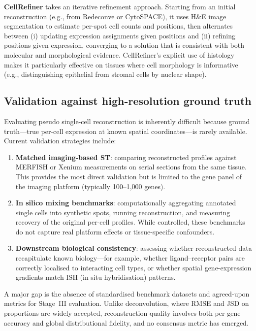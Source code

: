 \textbf{CellRefiner} \citep{cellrefiner2026} takes an iterative refinement approach. Starting from an initial reconstruction (e.g., from Redeconve or CytoSPACE), it uses H\&E image segmentation to estimate per-spot cell counts and positions, then alternates between (i) updating expression assignments given positions and (ii) refining positions given expression, converging to a solution that is consistent with both molecular and morphological evidence. CellRefiner's explicit use of histology makes it particularly effective on tissues where cell morphology is informative (e.g., distinguishing epithelial from stromal cells by nuclear shape).



\subsection{Validation against high-resolution ground truth}

Evaluating pseudo single-cell reconstruction is inherently difficult because ground truth---true per-cell expression at known spatial coordinates---is rarely available. Current validation strategies include:

\begin{enumerate}
  \item \textbf{Matched imaging-based ST}: comparing reconstructed profiles against MERFISH or Xenium measurements on serial sections from the same tissue. This provides the most direct validation but is limited to the gene panel of the imaging platform (typically 100--1{,}000 genes).
  \item \textbf{In silico mixing benchmarks}: computationally aggregating annotated single cells into synthetic spots, running reconstruction, and measuring recovery of the original per-cell profiles. While controlled, these benchmarks do not capture real platform effects or tissue-specific confounders.
  \item \textbf{Downstream biological consistency}: assessing whether reconstructed data recapitulate known biology---for example, whether ligand--receptor pairs are correctly localised to interacting cell types, or whether spatial gene-expression gradients match ISH (in situ hybridisation) patterns.
\end{enumerate}

A major gap is the absence of standardised benchmark datasets and agreed-upon metrics for Stage~III evaluation. Unlike deconvolution, where RMSE and JSD on proportions are widely accepted, reconstruction quality involves both per-gene accuracy and global distributional fidelity, and no consensus metric has emerged.

